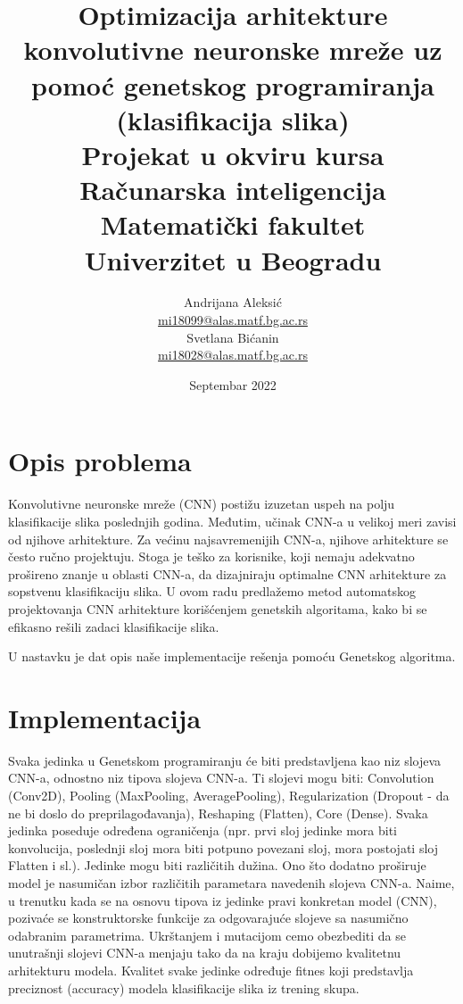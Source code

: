 \documentclass{article}
\title{%
  Optimizacija arhitekture konvolutivne neuronske  mreže uz pomoć genetskog programiranja (klasifikacija slika) \vspace{0.4cm} \\ 
  \large Projekat u okviru kursa Računarska inteligencija \\
  Matematički fakultet\\ Univerzitet u Beogradu \vspace*{0.5cm}}
\author{Andrijana Aleksić \\
\href{mailto:mi18099@alas.matf.bg.ac.rs}{mi18099@alas.matf.bg.ac.rs} \\
Svetlana Bićanin \\
\href{mailto:mi18028@alas.matf.bg.ac.rs}{mi18028@alas.matf.bg.ac.rs} \\
}
\date{\vspace*{1cm}Septembar 2022}
\begin{document}
\maketitle

\newpage

\renewcommand*\contentsname{Sadržaj}
\tableofcontents
\newpage

\section{Opis problema}

\hspace{1mm}
Konvolutivne neuronske mreže (CNN) postižu izuzetan uspeh na polju klasifikacije slika poslednjih godina. Međutim, učinak CNN-a u velikoj meri zavisi od njihove arhitekture. Za većinu najsavremenijih CNN-a, njihove arhitekture se često ručno projektuju. Stoga je teško za korisnike, koji nemaju adekvatno prošireno znanje u oblasti CNN-a, da dizajniraju optimalne CNN arhitekture za sopstvenu klasifikaciju slika. U ovom radu predlažemo metod automatskog projektovanja CNN arhitekture korišćenjem genetskih algoritama, kako bi se efikasno rešili zadaci klasifikacije slika.

\hspace{1mm}
U nastavku je dat opis naše implementacije rešenja pomoću Genetskog algoritma.

\section{Implementacija}
Svaka jedinka u Genetskom programiranju će biti predstavljena kao niz slojeva CNN-a, odnostno niz tipova slojeva CNN-a. Ti slojevi mogu biti: Convolution (Conv2D), Pooling (MaxPooling, AveragePooling), Regularization (Dropout - da ne bi doslo do preprilagođavanja), Reshaping (Flatten), Core (Dense). Svaka jedinka poseduje određena ograničenja (npr. prvi sloj jedinke mora biti konvolucija, poslednji sloj mora biti potpuno povezani sloj, mora postojati sloj Flatten i sl.). Jedinke mogu biti različitih dužina. Ono što dodatno proširuje model je nasumičan izbor različitih parametara navedenih slojeva CNN-a. Naime, u trenutku kada se na osnovu tipova iz jedinke pravi konkretan model (CNN), pozivaće se konstruktorske funkcije za odgovarajuće slojeve sa nasumično odabranim parametrima. Ukrštanjem i mutacijom cemo obezbediti da se unutrašnji slojevi CNN-a menjaju tako da na kraju dobijemo kvalitetnu arhitekturu modela. Kvalitet svake jedinke određuje fitnes koji predstavlja preciznost (accuracy) modela klasifikacije slika iz trening skupa.
\end{document}
